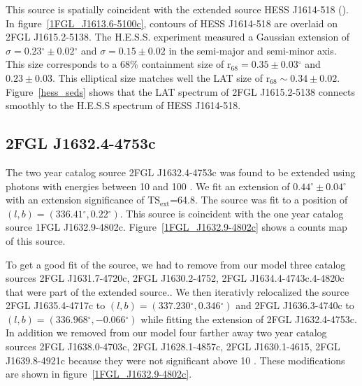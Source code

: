 \documentclass[12pt,preprint]{aastex}
\newcommand{\gev}{\text{GeV}\xspace}
\newcommand{\tev}{\text{TeV}\xspace}
\newcommand{\tsext}{{\ensuremath{\text{TS}_\text{ext}}}\xspace}
\newcommand{\rsixeight}{{\ensuremath{\text{r}_{68}}}\xspace}
\renewcommand{\deg}{\ensuremath{^\circ}\xspace}
\begin{document}
This source is spatially coincident with the extended \tev source HESS
J1614-518 (\cite{hess_plane_survey}). In figure~\ref{1FGL_J1613.6-5100c},
contours of HESS J1614-518 are overlaid on 2FGL J1615.2-5138.
The H.E.S.S. experiment measured a Gaussian extension of
$\sigma=0.23\deg\pm0.02\deg$ and $\sigma=0.15\pm0.02$ in the semi-major
and semi-minor axis. This size corresponds to a 68\% containment size
of $\rsixeight=0.35\pm0.03\deg$ and $0.23\pm0.03$.  This elliptical size
matches well the LAT size of $\rsixeight\sim0.34\pm0.02$.
Figure~\ref{hess_seds} shows that the LAT spectrum of
2FGL J1615.2-5138 connects smoothly to the 
H.E.S.S spectrum of HESS J1614-518.




\subsection{2FGL J1632.4-4753c}
\label{section_2FGL_J1632.4-4753c}



The two year catalog source 2FGL J1632.4-4753c was found to be
extended using photons with energies between 10 \gev and 100 \gev.
We fit an extension of $0.44\deg\pm0.04\deg$ with an extension
significance of \tsext=64.8.  The source was fit to a position of
$(l,b)=(336.41\deg,0.22\deg)$.  This source is coincident with the one
year catalog source 1FGL J1632.9-4802c.  Figure~\ref{1FGL_J1632.9-4802c}
shows a counts map of this source.

To get a good fit of the source, we had to remove from our model
three catalog sources 2FGL J1631.7-4720c, 2FGL J1630.2-4752, 2FGL
J1634.4-4743c.4-4820c that were part of the extended source..
We then iterativly relocalized the source 2FGL J1635.4-4717c
to $(l,b)=(337.230\deg,0.346\deg)$ and 2FGL J1636.3-4740c to
$(l,b)=(336.968\deg,-0.066\deg)$ while fitting the extension of
2FGL J1632.4-4753c.  In addition we removed from our model four
farther away two year catalog sources 2FGL J1638.0-4703c, 2FGL
J1628.1-4857c, 2FGL  J1630.1-4615, 2FGL J1639.8-4921c because they
were not significant above 10 \gev.  These modifications are shown in
figure~\ref{1FGL_J1632.9-4802c}.
\end{document}
